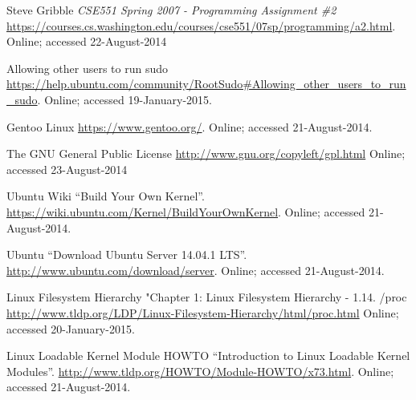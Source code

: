 \documentclass[11pt]{article}
\begin{document}
\begin{thebibliography}{3}

 Steve Gribble
	\newblock \emph{CSE551 Spring 2007 - Programming Assignment \#2}
	\newblock \url{https://courses.cs.washington.edu/courses/cse551/07sp/programming/a2.html}.
	\newblock Online; accessed 22-August-2014 

 Allowing other users to run sudo
	\newblock \url{https://help.ubuntu.com/community/RootSudo#Allowing_other_users_to_run_sudo}.
	\newblock Online; accessed 19-January-2015.	
	
 Gentoo Linux
	\newblock \url{https://www.gentoo.org/}.
	\newblock Online; accessed 21-August-2014.	
	
 The GNU General Public License
	\newblock \url{http://www.gnu.org/copyleft/gpl.html}
	\newblock Online; accessed 23-August-2014 


 Ubuntu Wiki
  \newblock ``Build Your Own Kernel''.
  \newblock
  \url{https://wiki.ubuntu.com/Kernel/BuildYourOwnKernel}.
  \newblock Online; accessed 21-August-2014.
  
 Ubuntu
  \newblock ``Download Ubuntu Server 14.04.1 LTS''.
  \newblock
  \url{ http://www.ubuntu.com/download/server}.
  \newblock Online; accessed 21-August-2014.
  
   Linux Filesystem Hierarchy
  	\newblock "Chapter 1: Linux Filesystem Hierarchy - 1.14. /proc
	\newblock \url{http://www.tldp.org/LDP/Linux-Filesystem-Hierarchy/html/proc.html}
	\newblock Online; accessed 20-January-2015.
   
  
 Linux Loadable Kernel Module HOWTO
  \newblock ``Introduction to Linux Loadable Kernel Modules''.
  \newblock
  \url{http://www.tldp.org/HOWTO/Module-HOWTO/x73.html}.
  \newblock Online; accessed 21-August-2014.

\end{thebibliography}
\end{document}
